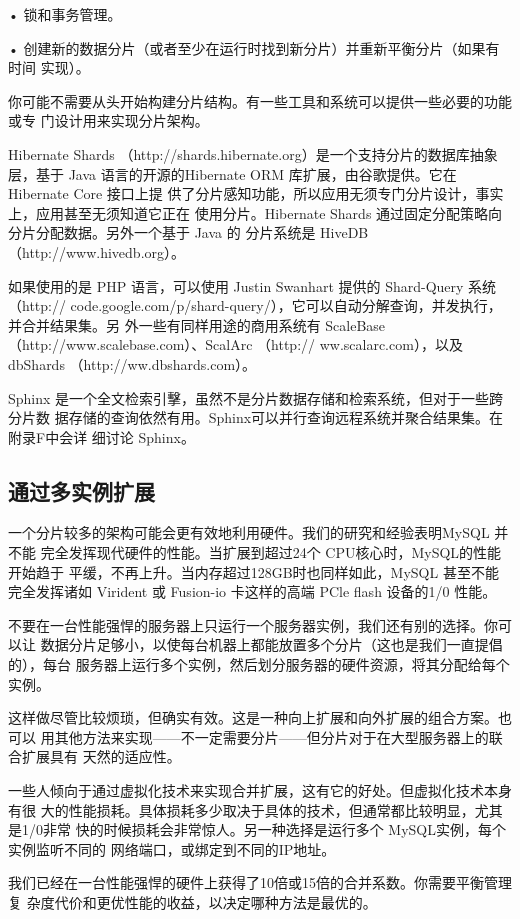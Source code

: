 • 锁和事务管理。

• 创建新的数据分片（或者至少在运行时找到新分片）并重新平衡分片（如果有时间
实现）。

你可能不需要从头开始构建分片结构。有一些工具和系统可以提供一些必要的功能或专
门设计用来实现分片架构。

Hibernate Shards （http://shards.hibernate.org）是一个支持分片的数据库抽象层，基于
Java 语言的开源的Hibernate ORM 库扩展，由谷歌提供。它在 Hibernate Core 接口上提
供了分片感知功能，所以应用无须专门分片设计，事实上，应用甚至无须知道它正在
使用分片。Hibernate Shards 通过固定分配策略向分片分配数据。另外一个基于 Java 的
分片系统是 HiveDB（http://www.hivedb.org）。

如果使用的是 PHP 语言，可以使用 Justin Swanhart 提供的 Shard-Query 系统 （http://
code.google.com/p/shard-query/），它可以自动分解查询，并发执行，并合并结果集。另
外一些有同样用途的商用系统有 ScaleBase（http://www.scalebase.com）、ScalArc （http://
ww.scalarc.com），以及 dbShards （http://ww.dbshards.com）。

Sphinx 是一个全文检索引擊，虽然不是分片数据存储和检索系统，但对于一些跨分片数
据存储的查询依然有用。Sphinx可以并行查询远程系统并聚合结果集。在附录F中会详
细讨论 Sphinx。

\subsection{通过多实例扩展}
一个分片较多的架构可能会更有效地利用硬件。我们的研究和经验表明MySQL 并不能
完全发挥现代硬件的性能。当扩展到超过24个 CPU核心时，MySQL的性能开始趋于
平缓，不再上升。当内存超过128GB时也同样如此，MySQL 甚至不能完全发挥诸如
Virident 或 Fusion-io 卡这样的高端 PCle flash 设备的1/0 性能。

不要在一台性能强悍的服务器上只运行一个服务器实例，我们还有别的选择。你可以让
数据分片足够小，以使每台机器上都能放置多个分片（这也是我们一直提倡的），每台
服务器上运行多个实例，然后划分服务器的硬件资源，将其分配给每个实例。

这样做尽管比较烦琐，但确实有效。这是一种向上扩展和向外扩展的组合方案。也可以
用其他方法来实现——不一定需要分片——但分片对于在大型服务器上的联合扩展具有
天然的适应性。

一些人倾向于通过虚拟化技术来实现合并扩展，这有它的好处。但虚拟化技术本身有很
大的性能损耗。具体损耗多少取决于具体的技术，但通常都比较明显，尤其是1/0非常
快的时候损耗会非常惊人。另一种选择是运行多个 MySQL实例，每个实例监听不同的
网络端口，或绑定到不同的IP地址。

我们已经在一台性能强悍的硬件上获得了10倍或15倍的合并系数。你需要平衡管理复
杂度代价和更优性能的收益，以决定哪种方法是最优的。

